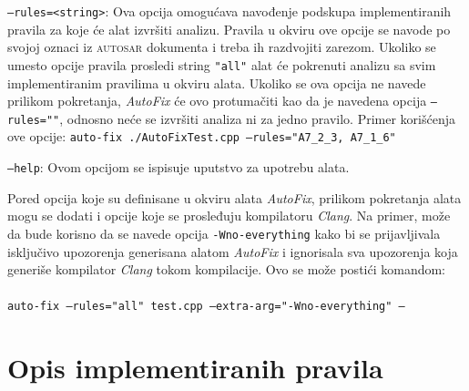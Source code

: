 \documentclass[12pt,oneside]{memoir}
\begin{document}
\begin{description}
    \item \texttt{--rules=<string>}: Ova opcija omogu\'{c}ava navođenje podskupa implementiranih pravila za koje \'{c}e alat izvr\v{s}iti analizu. Pravila u okviru ove opcije
    se navode po svojoj oznaci iz \textsc{autosar} dokumenta i treba ih razdvojiti zarezom. Ukoliko se umesto opcije pravila prosledi string \texttt{"all"} alat \'{c}e pokrenuti
    analizu sa svim implementiranim pravilima u okviru alata. Ukoliko se ova opcija ne navede prilikom pokretanja, \textit{AutoFix} \'{c}e ovo protuma\v{c}iti kao da je navedena opcija \texttt{--rules=""}, odnosno ne\'{c}e se izvr\v{s}iti analiza ni za jedno pravilo.
    Primer kori\v{s}\'{c}enja ove opcije: \newline\newline
    \texttt{auto-fix ./AutoFixTest.cpp --rules="A7\_2\_3, A7\_1\_6"} \\
    \item \texttt{--help}: Ovom opcijom se ispisuje uputstvo za upotrebu alata.
  \end{description}

Pored opcija koje su definisane u okviru alata \textit{AutoFix}, prilikom pokretanja alata mogu se dodati i opcije koje se prosleđuju kompilatoru \textit{Clang}. Na primer, mo\v{z}e da bude korisno da se navede opcija \texttt{-Wno-everything} kako bi se prijavljivala isklju\v{c}ivo upozorenja generisana alatom \textit{AutoFix} i ignorisala sva upozorenja koja generi\v{s}e kompilator \textit{Clang} tokom kompilacije. Ovo se mo\v{z}e posti\'{c}i komandom: \\ \\
\texttt{auto-fix --rules="all" test.cpp --extra-arg="-Wno-everything" --}


\section{Opis implementiranih pravila}
\label{sec:implementiranaPravila}
\end{document}
